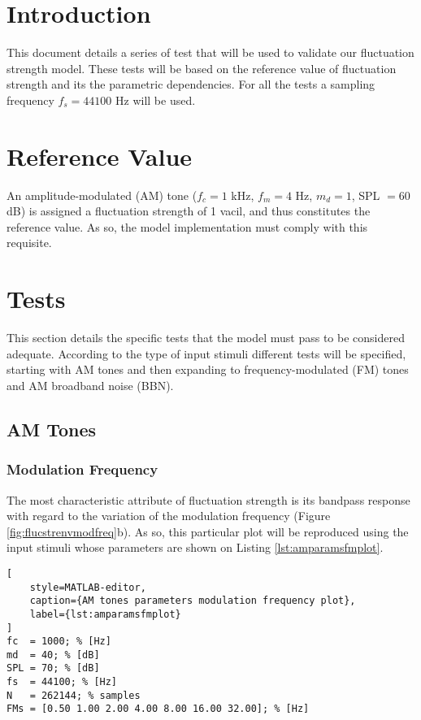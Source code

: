 \documentclass[a4paper]{article}
\begin{document}

\section{Introduction}

This document details a series of test that will be used to validate our
fluctuation strength model. These tests will be based on the reference value of
fluctuation strength and its the parametric dependencies. For all the tests a
sampling frequency $f_s = 44100 $ Hz will be used.

\section{Reference Value}

An amplitude-modulated (AM) tone ($f_c = 1$ kHz, $f_m = 4$ Hz, $m_d = 1$,
SPL $=60$ dB) is assigned a fluctuation strength of 1 vacil, and thus
constitutes the reference value. As so, the model implementation must comply
with this requisite.

\section{Tests}

This section details the specific tests that the model must pass to be
considered adequate. According to the type of input stimuli different tests
will be specified, starting with AM tones and then expanding to
frequency-modulated (FM) tones and AM broadband noise (BBN).

\subsection{AM Tones}

\subsubsection{Modulation Frequency}

The most characteristic attribute of fluctuation strength is its bandpass
response with regard to the variation of the modulation frequency (Figure
\ref{fig:flucstrenvmodfreq}b). As so, this particular plot will be reproduced
using the input stimuli whose parameters are shown on Listing
\ref{lst:amparamsfmplot}.

\begin{lstlisting}[
    style=MATLAB-editor,
    caption={AM tones parameters modulation frequency plot},
    label={lst:amparamsfmplot}
]
fc  = 1000; % [Hz]
md  = 40; % [dB]
SPL = 70; % [dB]
fs  = 44100; % [Hz]
N   = 262144; % samples
FMs = [0.50 1.00 2.00 4.00 8.00 16.00 32.00]; % [Hz]
\end{lstlisting}
\end{document}
